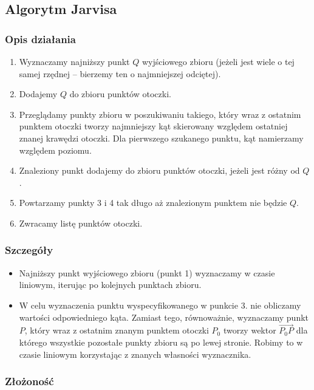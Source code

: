 \documentclass[11pt]{article}
\theoremstyle{remark} \newtheorem{definition}{def.}
\theoremstyle{definition} \newtheorem{twierdzenie}{tw.}
\begin{document}
\subsection{Algorytm Jarvisa}
    \subsubsection{Opis działania}
    \begin{enumerate}
        \item   Wyznaczamy najniższy punkt $Q$ wyjściowego zbioru (jeżeli jest wiele o tej samej rzędnej -- bierzemy ten o najmniejszej odciętej).
        \item   Dodajemy $Q$ do zbioru punktów otoczki. 
        \item   Przeglądamy punkty zbioru w poszukiwaniu takiego, który wraz z ostatnim punktem otoczki tworzy najmniejszy kąt skierowany względem ostatniej znanej
                krawędzi otoczki. Dla pierwszego szukanego punktu, kąt namierzamy względem poziomu.
        \item   Znaleziony punkt dodajemy do zbioru punktów otoczki, jeżeli jest różny od $Q$.
        \item   Powtarzamy punkty 3 i 4 tak długo aż znalezionym punktem nie będzie $Q$.
        \item   Zwracamy listę punktów otoczki. 
    \end{enumerate}
    \subsubsection{Szczegóły}
    \begin{itemize}
        \item   Najniższy punkt wyjściowego zbioru (punkt 1) wyznaczamy w czasie liniowym, iterując po kolejnych punktach zbioru.
        \item   W celu wyznaczenia punktu wyspecyfikowanego w punkcie 3. nie obliczamy wartości odpowiedniego kąta. Zamiast tego, równoważnie, wyznaczamy punkt $P$, 
                który wraz z ostatnim znanym punktem otoczki $P_0$ tworzy wektor $\vec{P_0P}$ dla którego wszystkie pozostałe punkty zbioru są po lewej stronie. Robimy 
                to w czasie liniowym korzystając z znanych własności wyznacznika. 
    \end{itemize}
    \subsubsection{Złożoność}
\end{document}
